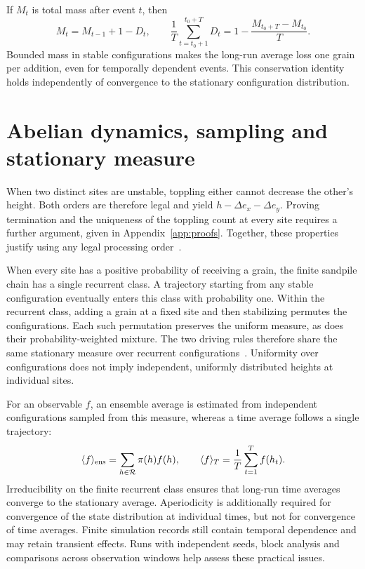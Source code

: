 \documentclass[11pt,a4paper,oneside]{report}
\numberwithin{equation}{chapter}
\begin{document}
If $M_t$ is total mass after event $t$, then
\begin{equation}
 M_t=M_{t-1}+1-D_t,\qquad
 \frac1T\sum_{t=t_0+1}^{t_0+T}D_t
 =1-\frac{M_{t_0+T}-M_{t_0}}{T}.
 \label{eq:mass}
\end{equation}
Bounded mass in stable configurations makes the long-run average loss one grain per addition, even for temporally dependent events. This conservation identity holds independently of convergence to the stationary configuration distribution.

\section{Abelian dynamics, sampling and stationary measure}
\label{sec:ergodicity}
When two distinct sites are unstable, toppling either cannot decrease the other's height. Both orders are therefore legal and yield $h-\Delta e_x-\Delta e_y$. Proving termination and the uniqueness of the toppling count at every site requires a further argument, given in Appendix~\ref{app:proofs}. Together, these properties justify using any legal processing order~\cite{dhar1990,jarai2018}.

When every site has a positive probability of receiving a grain, the finite sandpile chain has a single recurrent class. A trajectory starting from any stable configuration eventually enters this class with probability one. Within the recurrent class, adding a grain at a fixed site and then stabilizing permutes the configurations. Each such permutation preserves the uniform measure, as does their probability-weighted mixture. The two driving rules therefore share the same stationary measure over recurrent configurations~\cite{dhar1999,jarai2018}. Uniformity over configurations does not imply independent, uniformly distributed heights at individual sites.

For an observable $f$, an ensemble average is estimated from independent configurations sampled from this measure, whereas a time average follows a single trajectory:
\begin{equation}
 \langle f\rangle_{\rm ens}=\sum_{h\in\mathcal R}\pi(h)f(h),
 \qquad
 \langle f\rangle_T=\frac1T\sum_{t=1}^T f(h_t).
\end{equation}
Irreducibility on the finite recurrent class ensures that long-run time averages converge to the stationary average. Aperiodicity is additionally required for convergence of the state distribution at individual times, but not for convergence of time averages. Finite simulation records still contain temporal dependence and may retain transient effects. Runs with independent seeds, block analysis and comparisons across observation windows help assess these practical issues.
\end{document}
